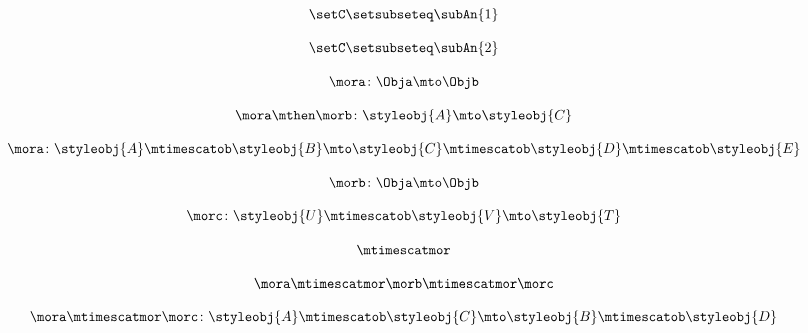 {\begin{forslides}
        \begin{equation}
            \label{eq:parallelism-075}
            \setC \setsubseteq \subAn{1}
        \end{equation}

        \begin{equation}
            \label{eq:parallelism-076}
            \setC \setsubseteq \subAn{2}
        \end{equation}

        \begin{equation}
            \label{eq:parallelism-077}
            \mora \colon \Obja \mto \Objb
        \end{equation}

        \begin{equation}
            \label{eq:parallelism-078}
            \mora \mthen \morb \colon \styleobj{A} \mto \styleobj{C}
        \end{equation}

        \begin{equation}
            \label{eq:parallelism-079}
            \mora \colon \styleobj{A} \mtimescatob \styleobj{B} \mto \styleobj{C} \mtimescatob \styleobj{D} \mtimescatob \styleobj{E}
        \end{equation}

        \begin{equation}
            \label{eq:parallelism-080}
            \morb \colon \Obja \mto \Objb
        \end{equation}

        \begin{equation}
            \label{eq:parallelism-081}
            \morc \colon \styleobj{U} \mtimescatob \styleobj{V} \mto \styleobj{T}
        \end{equation}

        \begin{equation}
            \label{eq:parallelism-082}
            \mtimescatmor
        \end{equation}

        \begin{equation}
            \label{eq:parallelism-083}
            \mora \mtimescatmor \morb \mtimescatmor \morc
        \end{equation}

        \begin{equation}
            \label{eq:parallelism-084}
            \mora \mtimescatmor \morc \colon \styleobj{A} \mtimescatob \styleobj{C} \mto \styleobj{B} \mtimescatob \styleobj{D}
        \end{equation}


\end{forslides}}
